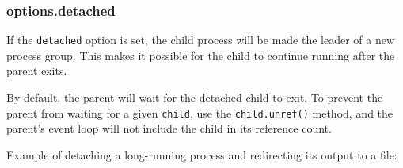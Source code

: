 \begin{Shaded}
\begin{Highlighting}[]
 \NormalTok{(}\NormalTok{;}

\NormalTok{(}\NormalTok{, [], \{ }\NormalTok{: } \NormalTok{\});}

\NormalTok{(}\NormalTok{, [], \{ }\NormalTok{: [}\NormalTok{, }\NormalTok{, }\NormalTok{] \});}

\NormalTok{(}\NormalTok{, [], \{ }\NormalTok{: [}\NormalTok{, }\NormalTok{, }\NormalTok{, }\NormalTok{, }\NormalTok{] \});}
\end{Highlighting}
\end{Shaded}

\subsubsection{options.detached}\label{options.detached}

If the \texttt{detached} option is set, the child process will be made
the leader of a new process group. This makes it possible for the child
to continue running after the parent exits.

By default, the parent will wait for the detached child to exit. To
prevent the parent from waiting for a given \texttt{child}, use the
\texttt{child.unref()} method, and the parent's event loop will not
include the child in its reference count.

Example of detaching a long-running process and redirecting its output
to a file:

